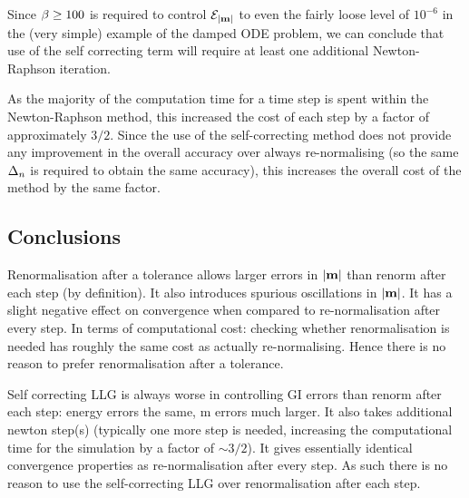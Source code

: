 Since $\beta \geq 100$ is required to control $\mathcal{E}_{\left|{\boldsymbol{\mathrm{m}}} \right|}$ to even the fairly loose level of $10^{-6}$ in the (very simple) example of the damped ODE problem, we can conclude that use of the self correcting term will require at least one additional Newton-Raphson iteration.

As the majority of the computation time for a time step is spent within the Newton-Raphson method, this increased the cost of each step by a factor of approximately $3/2$.
Since the use of the self-correcting method does not provide any improvement in the overall accuracy over always re-normalising (so the same $\Delta_{n}$ is required to obtain the same accuracy), this increases the overall cost of the method by the same factor.



\subsection{Conclusions}

Renormalisation after a tolerance allows larger errors in $\left|{\boldsymbol{\mathrm{m}}} \right|$ than renorm after each step (by definition).
It also introduces spurious oscillations in $\left|{\boldsymbol{\mathrm{m}}} \right|$.
It has a slight negative effect on convergence when compared to re-normalisation after every step.
In terms of computational cost: checking whether renormalisation is needed has roughly the same cost as actually re-normalising.
Hence there is no reason to prefer renormalisation after a tolerance.

Self correcting LLG is always worse in controlling GI errors than renorm after each step: energy errors the same, m errors much larger.
It also takes additional newton step(s) (typically one more step is needed, increasing the computational time for the simulation by a factor of $\sim 3/2$).
It gives essentially identical convergence properties as re-normalisation after every step.
As such there is no reason to use the self-correcting LLG over renormalisation after each step.

